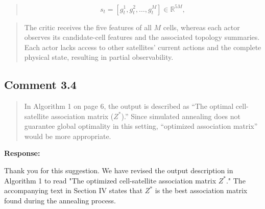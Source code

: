 \documentclass[11pt,a4paper]{article}
\begin{document}

\begin{quote}\small\color{revisionblue}
\begin{equation*}
s_t=[g_t^1,g_t^2,\ldots,g_t^M]\in\mathbb{R}^{5M},
\tag{32}\end{equation*}
\end{quote}


\begin{quote}\small\color{revisionblue}
The critic receives the five features of all $M$ cells, whereas each actor observes its candidate-cell features and the associated topology summaries. Each actor lacks access to other satellites' current actions and the complete physical state, resulting in partial observability.
\par
\end{quote}


\subsection*{Comment 3.4}

\begin{quote}\small In Algorithm 1 on page 6, the output is described as “The optimal cell-satellite association matrix ($Z^*$).” Since simulated annealing does not guarantee global optimality in this setting, “optimized association matrix” would be more appropriate.\end{quote}

\textbf{Response:}\par

Thank you for this suggestion. We have revised the output description in Algorithm 1 to read "The optimized cell-satellite association matrix $Z^*$." The accompanying text in Section IV states that $Z^*$ is the best association matrix found during the annealing process.
\par
\end{document}
